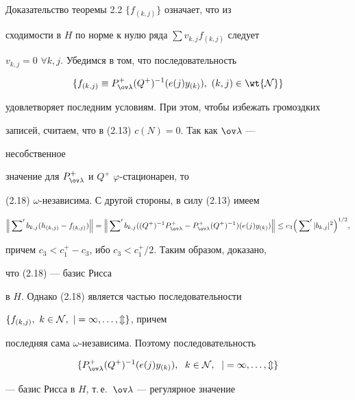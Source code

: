 \begin{pf*}{Доказательство теоремы 2.2}
$\{f_{(k,j)}\}$ означает, что из 


сходимости в $H$ по норме к нулю ряда $\sum{}v_{k,j}f_{(k,j)}$ следует 


$v_{k,j}=0$ $\forall k,j$. Убедимся в том, что последовательность 


\begin{equation} 


\{f_{(k,j)}\equiv P^+_{\ov\lambda}(Q^+)^{-1} 


(e(j)y_{(k)}),\ (k,j)\in\wt{\cal N}\} 


\end{equation} 


удовлетворяет последним условиям. При этом, чтобы избежать громоздких 


записей, считаем, что в (2.13)\; $c(N)=0$. Так как $\ov\lambda$ --- 


несобственное 


значение для $P^+_{\ov\lambda}$ и $Q^+$\; $\varphi$-стационарен, то 


(2.18)\; $\omega$-независима. С другой стороны, в силу (2.13) имеем 


$$ 


\Big\|\sideset{}{'}\sum b_{k,j}(h_{(k,j)}-f_{(k,j)})\Big\|= 


\Big\|\sideset{}{'}\sum b_{k,j}((Q^+)^{-1}P^+_{\ov\lambda} 


-P^+_{\ov\lambda}(Q^+)^{-1})(e(j)y_{(k)})\Big\|\le 


c_3\Big(\sideset{}{'}\sum|b_{k,j}|^2\Big)^{1/2}, 


$$ 


причем $c_3<c^+_1-c_3$, ибо $c_3<c^+_1/2$. Таким образом, доказано, 


что (2.18) --- базис Рисса 


в $H$. Однако (2.18) является частью последовательности 


$\{f_{(k,j)},\ k\in\cal N,\ j=1,\dotsc,m\}$, причем 


последняя сама $\omega$-независима. Поэтому последовательность 


\begin{equation} 


\{P^+_{\ov\lambda}(Q^+)^{-1}(e(j)y_{(k)}),\ \; 


k\in\cal N,\ \;j=1,\dotsc,m\} 


\end{equation} 


--- базис Рисса в $H$, т.\,е.~$\ov\lambda$ --- регулярное значение 



\end{pf*}
